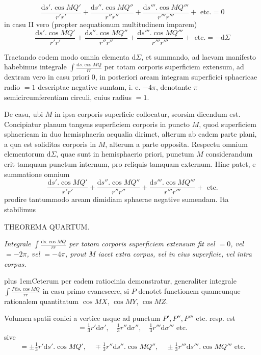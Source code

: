 \[
\frac{\mathrm{d}s'.\cos MQ'}{r'r'}+\frac{\mathrm{d}s''.\cos MQ''}{r''r''}+\frac{\mathrm{d}s'''.\cos MQ'''}{r'''r'''}+\text{ etc.}=0
\]
in casu II vero (propter aequationum multitudinem imparem)
\[
\frac{\mathrm{d}s'.\cos MQ'}{r'r'}+\frac{\mathrm{d}s''.\cos MQ''}{r''r''}+\frac{\mathrm{d}s'''.\cos MQ'''}{r'''r'''}+\text{ etc.}=-\mathrm{d}\Sigma
\]
\par
Tractando eodem modo omnia elementa $\mathrm{d}\Sigma$, et summando, ad laevam manifesto habebimus integrale $\int\frac{\mathrm{d}s.\cos MQ}{rr}$ per totam corporis superficiem extensum, ad dextram vero in casu priori $0$, in posteriori aream integram superficiei sphaericae radio $=1$ descriptae negative sumtam, i. e. $-4\pi$, denotante $\pi$ semicircumferentiam circuli, cuius radius $=1$.

De casu, ubi $M$ in ipsa corporis superficie collocatur, seorsim dicendum est. Concipiatur planum tangens superficiem corporis in puncto $M$, quod superficiem sphaericam in duo hemisphaeria aequalia dirimet, alterum ab eadem parte plani, a qua est soliditas corporis in $M$, alterum a parte opposita. Respectu omnium elementorum $\mathrm{d}\Sigma$, quae sunt in hemisphaerio priori, punctum $M$ considerandum erit tamquam punctum internum, pro reliquis tamquam externum. Hinc patet, e summatione omnium
\[
\frac{\mathrm{d}s'.\cos MQ'}{r'r'}+\frac{\mathrm{d}s''.\cos MQ''}{r''r''}+\frac{\mathrm{d}s'''.\cos MQ'''}{r'''r'''}+\text{ etc.}
\]
prodire tantummodo aream dimidiam sphaerae negative sumendam. Ita stabilimus
\par\medskip{}
\begin{center}THEOREMA QUARTUM.\end{center}
\par
\textit{Integrale $\int\frac{\mathrm{d}s.\cos MQ}{rr}$ per totam corporis superficiem extensum fit vel $=0$, vel $=-2\pi$, vel $=-4\pi$, prout $M$ iacet extra corpus, vel in eius superficie, vel intra corpus.}
\par
{\rightskip=0pt plus 1em\noindent\hspace*{\parindent}Ceterum per eadem ratiocinia demonstratur, generaliter integrale $\int\frac{P\mathrm{d}s.\cos MQ}{rr}$ in casu primo evanescere, si $P$ denotet functionem quamcunque rationalem quantitatum $\cos MX$, $\cos MY$, $\cos MZ$.\par}

\par
Volumen spatii conici a vertice usque ad punctum $P',P'',P'''$ etc. resp. est
\[
=\tfrac13r'\mathrm{d}\sigma',\quad\tfrac13r''\mathrm{d}\sigma'',\quad\tfrac13r'''\mathrm{d}\sigma'''\text{ etc.}
\]
sive
\[
=\pm\tfrac13r'\mathrm{d}s'.\cos MQ',\quad\mp\tfrac13r''\mathrm{d}s''.\cos MQ'',\quad\pm\tfrac13r'''\mathrm{d}s'''.\cos MQ'''\text{ etc.}
\]
